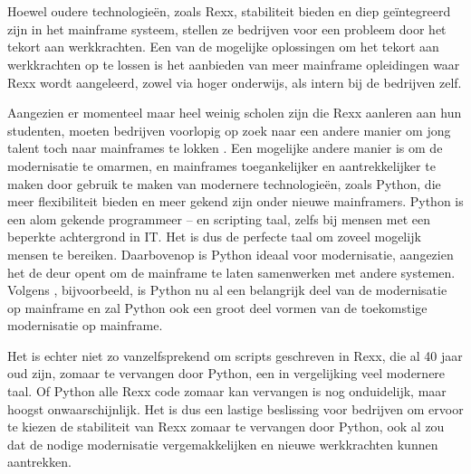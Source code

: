 \section{}%
\label{sec:probleemstelling}

 Hoewel oudere technologieën, zoals Rexx, stabiliteit bieden en diep geïntegreerd zijn in het mainframe systeem, stellen ze bedrijven voor een probleem door het tekort aan werkkrachten. Een van de mogelijke oplossingen om het tekort aan werkkrachten op te lossen is het aanbieden van meer mainframe opleidingen waar Rexx wordt aangeleerd, zowel via hoger onderwijs, als intern bij de bedrijven zelf. 

Aangezien er momenteel maar heel weinig scholen zijn die Rexx aanleren aan hun studenten, moeten bedrijven voorlopig op zoek naar een andere manier om jong talent toch naar mainframes te lokken \autocite{Blondeel2025}. Een mogelijke andere manier is om de modernisatie te omarmen, en mainframes toegankelijker en aantrekkelijker te maken door gebruik te maken van modernere technologieën, zoals Python, die meer flexibiliteit bieden en meer gekend zijn onder nieuwe mainframers. Python is een alom gekende programmeer – en scripting taal, zelfs bij mensen met een beperkte achtergrond in IT. Het is dus de perfecte taal om zoveel mogelijk mensen te bereiken. Daarbovenop is Python ideaal voor modernisatie, aangezien het de deur opent om de mainframe te laten samenwerken met andere systemen. Volgens \textcite{Gilio2021}, bijvoorbeeld, is Python nu al een belangrijk deel van de modernisatie op mainframe en zal Python ook een groot deel vormen van de toekomstige modernisatie op mainframe. 

Het is echter niet zo vanzelfsprekend om scripts geschreven in Rexx, die al 40 jaar oud zijn, zomaar te vervangen door Python, een in vergelijking veel modernere taal. Of Python alle Rexx code zomaar kan vervangen is nog onduidelijk, maar hoogst onwaarschijnlijk. Het is dus een lastige beslissing voor bedrijven om ervoor te kiezen de stabiliteit van Rexx zomaar te vervangen door Python, ook al zou dat de nodige modernisatie vergemakkelijken en nieuwe werkkrachten kunnen aantrekken.


\section{}%
\label{sec:onderzoeksvraag}

